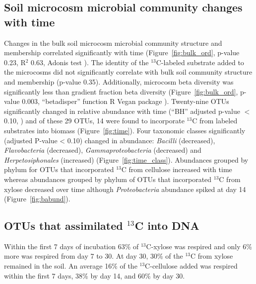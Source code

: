 \subsection{Soil microcosm microbial community changes with time}
Changes in the bulk soil microcosm microbial community structure and membership
correlated significantly with time (Figure~\ref{fig:bulk_ord},
p-value 0.23, R$^{2}$ 0.63, Adonis test \citep{Anderson2001a}). The identity of
the $^{13}$C-labeled substrate added to the microcosms did not significantly
correlate with bulk soil community structure and membership (p-value 0.35).
Additionally, microcosm beta diversity was significantly less than gradient
fraction beta diversity (Figure~\ref{fig:bulk_ord}, p-value 0.003,
``betadisper'' function R Vegan package \citep{Anderson2006,oksanen2007vegan}).
Twenty-nine OTUs significantly changed in relative abundance with time (``BH''
adjusted p-value $<$0.10, \citep{YBenjamini1995}) and of these 29 OTUs, 14 were
found to incorporate $^{13}$C from labeled substrates into biomass
(Figure~\ref{fig:time}). Four taxonomic classes significantly (adjusted P-value
< 0.10) changed in abundance: \textit{Bacilli} (decreased),
\textit{Flavobacteria} (decreased), \textit{Gammaproteobacteria} (decreased)
and \textit{Herpetosiphonales} (increased) (Figure~\ref{fig:time_class}).
Abundances grouped by phylum for OTUs that incorporated $^{13}$C from cellulose
increased with time whereas abundances grouped by phylum of OTUs that
incorporated $^{13}$C from xylose decreased over time although
\textit{Proteobacteria} abundance spiked at day 14 (Figure~\ref{fig:babund}).

\subsection{OTUs that assimilated $^{13}$C into DNA} \label{responders}
Within the first 7 days of incubation 63\% of $^{13}$C-xylose was
respired and only 6\% more was respired from day 7 to 30. At day 30, 30\% of
the $^{13}$C from xylose remained in the soil. An average 16\% of the
$^{13}$C-cellulose added was respired within the first 7 days, 38\% by day 14,
and 60\% by day 30.   

